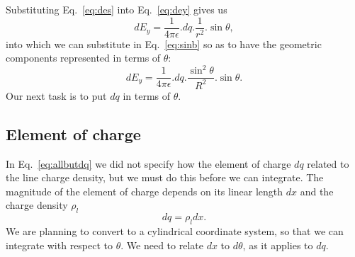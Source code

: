 \documentclass{tufte-handout}
\begin{document}
Substituting Eq.~\ref{eq:des} into Eq.~\ref{eq:dey} gives us
\begin{equation}
dE_y = \frac{1}{4\pi\epsilon}.dq.\frac{1}{r^2}.\sin\theta,
\end{equation} 
into which we can substitute in Eq.~\ref{eq:sinb} so as to have the geometric components represented in terms of $\theta$:
\begin{equation}
\label{eq:allbutdq}
dE_y = \frac{1}{4\pi\epsilon}.dq.\frac{\sin^2\theta}{R^2}.\sin\theta.
\end{equation} 
Our next task is to put $dq$ in terms of $\theta$.

\begin{marginfigure}

\end{marginfigure}

\subsection{Element of charge}
In Eq.~\ref{eq:allbutdq} we did not specify how the element of charge $dq$ related to the line charge density, but we must do this before we can integrate. The magnitude of the element of charge depends on its linear length $dx$ and the charge density $\rho_l$
\begin{equation}
\label{eq:dq}
dq = \rho_ldx.
\end{equation}
We are planning to convert to a cylindrical coordinate system, so that we can integrate with respect to $\theta$. We need to relate $dx$ to $d\theta$, as it applies to $dq$.
\begin{marginfigure}

\end{marginfigure}
\end{document}
